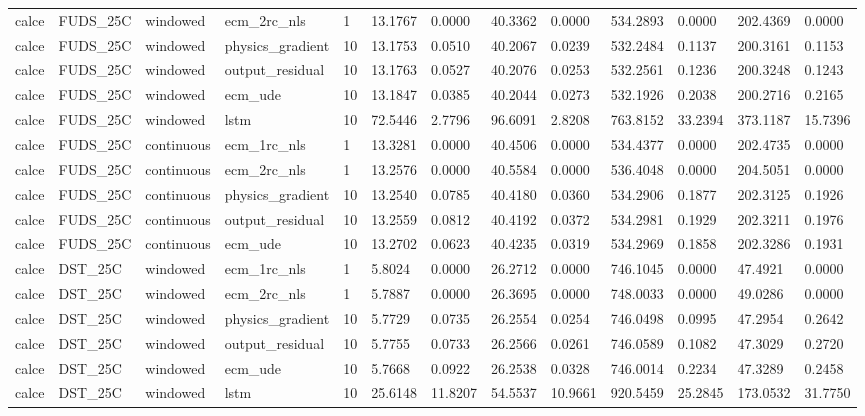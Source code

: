 \begin{tabular}{lllllllllllll}
calce & FUDS\_25C & windowed & ecm\_2rc\_nls & 1 & 13.1767 & 0.0000 & 40.3362 & 0.0000 & 534.2893 & 0.0000 & 202.4369 & 0.0000 \\
calce & FUDS\_25C & windowed & physics\_gradient & 10 & 13.1753 & 0.0510 & 40.2067 & 0.0239 & 532.2484 & 0.1137 & 200.3161 & 0.1153 \\
calce & FUDS\_25C & windowed & output\_residual & 10 & 13.1763 & 0.0527 & 40.2076 & 0.0253 & 532.2561 & 0.1236 & 200.3248 & 0.1243 \\
calce & FUDS\_25C & windowed & ecm\_ude & 10 & 13.1847 & 0.0385 & 40.2044 & 0.0273 & 532.1926 & 0.2038 & 200.2716 & 0.2165 \\
calce & FUDS\_25C & windowed & lstm & 10 & 72.5446 & 2.7796 & 96.6091 & 2.8208 & 763.8152 & 33.2394 & 373.1187 & 15.7396 \\
calce & FUDS\_25C & continuous & ecm\_1rc\_nls & 1 & 13.3281 & 0.0000 & 40.4506 & 0.0000 & 534.4377 & 0.0000 & 202.4735 & 0.0000 \\
calce & FUDS\_25C & continuous & ecm\_2rc\_nls & 1 & 13.2576 & 0.0000 & 40.5584 & 0.0000 & 536.4048 & 0.0000 & 204.5051 & 0.0000 \\
calce & FUDS\_25C & continuous & physics\_gradient & 10 & 13.2540 & 0.0785 & 40.4180 & 0.0360 & 534.2906 & 0.1877 & 202.3125 & 0.1926 \\
calce & FUDS\_25C & continuous & output\_residual & 10 & 13.2559 & 0.0812 & 40.4192 & 0.0372 & 534.2981 & 0.1929 & 202.3211 & 0.1976 \\
calce & FUDS\_25C & continuous & ecm\_ude & 10 & 13.2702 & 0.0623 & 40.4235 & 0.0319 & 534.2969 & 0.1858 & 202.3286 & 0.1931 \\
calce & DST\_25C & windowed & ecm\_1rc\_nls & 1 & 5.8024 & 0.0000 & 26.2712 & 0.0000 & 746.1045 & 0.0000 & 47.4921 & 0.0000 \\
calce & DST\_25C & windowed & ecm\_2rc\_nls & 1 & 5.7887 & 0.0000 & 26.3695 & 0.0000 & 748.0033 & 0.0000 & 49.0286 & 0.0000 \\
calce & DST\_25C & windowed & physics\_gradient & 10 & 5.7729 & 0.0735 & 26.2554 & 0.0254 & 746.0498 & 0.0995 & 47.2954 & 0.2642 \\
calce & DST\_25C & windowed & output\_residual & 10 & 5.7755 & 0.0733 & 26.2566 & 0.0261 & 746.0589 & 0.1082 & 47.3029 & 0.2720 \\
calce & DST\_25C & windowed & ecm\_ude & 10 & 5.7668 & 0.0922 & 26.2538 & 0.0328 & 746.0014 & 0.2234 & 47.3289 & 0.2458 \\
calce & DST\_25C & windowed & lstm & 10 & 25.6148 & 11.8207 & 54.5537 & 10.9661 & 920.5459 & 25.2845 & 173.0532 & 31.7750 \\

\end{tabular}
